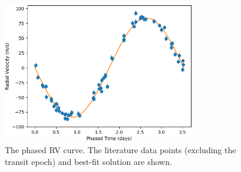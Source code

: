 \documentclass[12pt]{article}
\begin{document}
\vspace{-1em}
\begin{figure}[H]
\centering
\includegraphics[width=0.75\textwidth]{transitlessrv.png}
\vspace{-0.5em}
\caption{The phased RV curve. The literature data points (excluding the transit epoch) and best-fit solution are shown.}
\end{figure}
\end{document}
